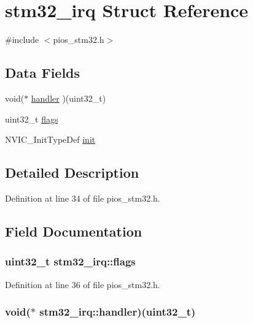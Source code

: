\hypertarget{structstm32__irq}{\section{stm32\-\_\-irq \-Struct \-Reference}
\label{structstm32__irq}
}


{\ttfamily \#include $<$pios\-\_\-stm32.\-h$>$}

\subsection*{\-Data \-Fields}
\begin{DoxyCompactItemize}
\item 
void($\ast$ \hyperlink{structstm32__irq_a4d9346b23aedfb76b515e0273e9321de}{handler} )(uint32\-\_\-t)
\item 
uint32\-\_\-t \hyperlink{structstm32__irq_a1f30de822fa143fc12ecff712d96df7c}{flags}
\item 
\-N\-V\-I\-C\-\_\-\-Init\-Type\-Def \hyperlink{structstm32__irq_aef3e74e894b4025023b6be1ab8b4348f}{init}
\end{DoxyCompactItemize}


\subsection{\-Detailed \-Description}


\-Definition at line 34 of file pios\-\_\-stm32.\-h.



\subsection{\-Field \-Documentation}
\hypertarget{structstm32__irq_a1f30de822fa143fc12ecff712d96df7c}{
\subsubsection[{flags}]{\setlength{\rightskip}{0pt plus 5cm}uint32\-\_\-t {\bf stm32\-\_\-irq\-::flags}}}\label{structstm32__irq_a1f30de822fa143fc12ecff712d96df7c}


\-Definition at line 36 of file pios\-\_\-stm32.\-h.

\hypertarget{structstm32__irq_a4d9346b23aedfb76b515e0273e9321de}{
\subsubsection[{handler}]{\setlength{\rightskip}{0pt plus 5cm}void($\ast$ {\bf stm32\-\_\-irq\-::handler})(uint32\-\_\-t)}}\label{structstm32__irq_a4d9346b23aedfb76b515e0273e9321de}


